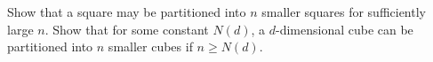 Show that a square may be partitioned into \(n\) smaller squares for sufficiently large \(n\).
Show that for some constant \(N(d)\), a \(d\)-dimensional cube can be partitioned into \(n\) smaller cubes if \(n \geq N(d) \).